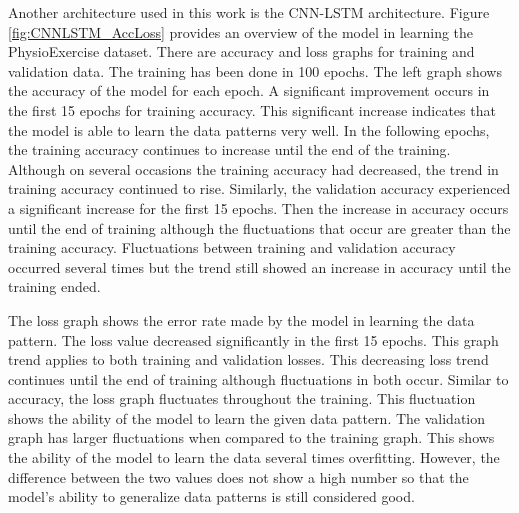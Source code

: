 Another architecture used in this work is the CNN-LSTM architecture. Figure \ref{fig:CNNLSTM_AccLoss} provides an overview of the model in learning the PhysioExercise dataset. There are accuracy and loss graphs for training and validation data. The training has been done in 100 epochs. The left graph shows the accuracy of the model for each epoch. A significant improvement occurs in the first 15 epochs for training accuracy. This significant increase indicates that the model is able to learn the data patterns very well. In the following epochs, the training accuracy continues to increase until the end of the training. Although on several occasions the training accuracy had decreased, the trend in training accuracy continued to rise. Similarly, the validation accuracy experienced a significant increase for the first 15 epochs. Then the increase in accuracy occurs until the end of training although the fluctuations that occur are greater than the training accuracy. Fluctuations between training and validation accuracy occurred several times but the trend still showed an increase in accuracy until the training ended.



The loss graph shows the error rate made by the model in learning the data pattern. The loss value decreased significantly in the first 15 epochs. This graph trend applies to both training and validation losses. This decreasing loss trend continues until the end of training although fluctuations in both occur. Similar to accuracy, the loss graph fluctuates throughout the training. This fluctuation shows the ability of the model to learn the given data pattern. The validation graph has larger fluctuations when compared to the training graph. This shows the ability of the model to learn the data several times overfitting. However, the difference between the two values does not show a high number so that the model's ability to generalize data patterns is still considered good.

